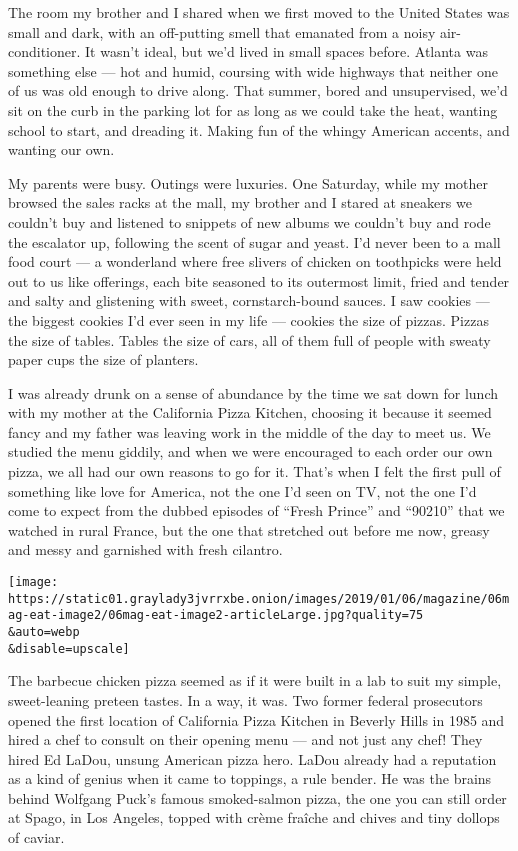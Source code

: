 The room my brother and I shared when we first moved to the United
States was small and dark, with an off-putting smell that emanated from
a noisy air-conditioner. It wasn't ideal, but we'd lived in small spaces
before. Atlanta was something else --- hot and humid, coursing with wide
highways that neither one of us was old enough to drive along. That
summer, bored and unsupervised, we'd sit on the curb in the parking lot
for as long as we could take the heat, wanting school to start, and
dreading it. Making fun of the whingy American accents, and wanting our
own.

My parents were busy. Outings were luxuries. One Saturday, while my
mother browsed the sales racks at the mall, my brother and I stared at
sneakers we couldn't buy and listened to snippets of new albums we
couldn't buy and rode the escalator up, following the scent of sugar and
yeast. I'd never been to a mall food court --- a wonderland where free
slivers of chicken on toothpicks were held out to us like offerings,
each bite seasoned to its outermost limit, fried and tender and salty
and glistening with sweet, cornstarch-bound sauces. I saw cookies ---
the biggest cookies I'd ever seen in my life --- cookies the size of
pizzas. Pizzas the size of tables. Tables the size of cars, all of them
full of people with sweaty paper cups the size of planters.

I was already drunk on a sense of abundance by the time we sat down for
lunch with my mother at the California Pizza Kitchen, choosing it
because it seemed fancy and my father was leaving work in the middle of
the day to meet us. We studied the menu giddily, and when we were
encouraged to each order our own pizza, we all had our own reasons to go
for it. That's when I felt the first pull of something like love for
America, not the one I'd seen on TV, not the one I'd come to expect from
the dubbed episodes of ``Fresh Prince'' and ``90210'' that we watched in
rural France, but the one that stretched out before me now, greasy and
messy and garnished with fresh cilantro.

\texttt{[image: https://static01.graylady3jvrrxbe.onion/images/2019/01/06/magazine/06mag-eat-image2/06mag-eat-image2-articleLarge.jpg?quality=75\\\&auto=webp\\\&disable=upscale]}

The barbecue chicken pizza seemed as if it were built in a lab to suit
my simple, sweet-leaning preteen tastes. In a way, it was. Two former
federal prosecutors opened the first location of California Pizza
Kitchen in Beverly Hills in 1985 and hired a chef to consult on their
opening menu --- and not just any chef! They hired Ed LaDou, unsung
American pizza hero. LaDou already had a reputation as a kind of genius
when it came to toppings, a rule bender. He was the brains behind
Wolfgang Puck's famous smoked-salmon pizza, the one you can still order
at Spago, in Los Angeles, topped with crème fraîche and chives and tiny
dollops of caviar.

